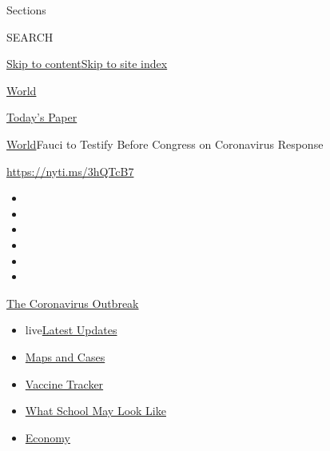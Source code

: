 Sections

SEARCH

\protect\hyperlink{site-content}{Skip to
content}\protect\hyperlink{site-index}{Skip to site index}

\href{https://www.nytimes3xbfgragh.onion/section/world}{World}

\href{https://myaccount.nytimes3xbfgragh.onion/auth/login?response_type=cookie\&client_id=vi}{}

\href{https://www.nytimes3xbfgragh.onion/section/todayspaper}{Today's
Paper}

\href{/section/world}{World}\textbar{}Fauci to Testify Before Congress
on Coronavirus Response

\url{https://nyti.ms/3hQTcB7}

\begin{itemize}
\item
\item
\item
\item
\item
\item
\end{itemize}

\href{https://www.nytimes3xbfgragh.onion/news-event/coronavirus?action=click\&pgtype=Article\&state=default\&region=TOP_BANNER\&context=storylines_menu}{The
Coronavirus Outbreak}

\begin{itemize}
\tightlist
\item
  live\href{https://www.nytimes3xbfgragh.onion/2020/08/01/world/coronavirus-covid-19.html?action=click\&pgtype=Article\&state=default\&region=TOP_BANNER\&context=storylines_menu}{Latest
  Updates}
\item
  \href{https://www.nytimes3xbfgragh.onion/interactive/2020/us/coronavirus-us-cases.html?action=click\&pgtype=Article\&state=default\&region=TOP_BANNER\&context=storylines_menu}{Maps
  and Cases}
\item
  \href{https://www.nytimes3xbfgragh.onion/interactive/2020/science/coronavirus-vaccine-tracker.html?action=click\&pgtype=Article\&state=default\&region=TOP_BANNER\&context=storylines_menu}{Vaccine
  Tracker}
\item
  \href{https://www.nytimes3xbfgragh.onion/interactive/2020/07/29/us/schools-reopening-coronavirus.html?action=click\&pgtype=Article\&state=default\&region=TOP_BANNER\&context=storylines_menu}{What
  School May Look Like}
\item
  \href{https://www.nytimes3xbfgragh.onion/live/2020/07/31/business/stock-market-today-coronavirus?action=click\&pgtype=Article\&state=default\&region=TOP_BANNER\&context=storylines_menu}{Economy}
\end{itemize}

